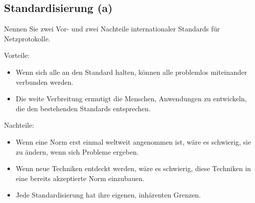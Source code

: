 \setcounter{section}{1}
\setcounter{subsection}{5} %
\subsection{Standardisierung (a)}

Nennen Sie zwei Vor- und zwei Nachteile internationaler Standards für
Netzprotokolle.

Vorteile:
\begin{itemize}
    \item Wenn sich alle an den Standard halten, können alle problemlos
        miteinander verbunden werden.
    \item Die weite Verbreitung ermutigt die Menschen, Anwendungen zu
        entwickeln, die den bestehenden Standards entsprechen.
\end{itemize}

Nachteile:
\begin{itemize}
    \item Wenn eine Norm erst einmal weltweit angenommen ist, wäre es
        schwierig, sie zu ändern, wenn sich Probleme ergeben.
    \item Wenn neue Techniken entdeckt werden, wäre es schwierig, diese
        Techniken in eine bereits akzeptierte Norm einzubauen.
    \item Jede Standardisierung hat ihre eigenen, inhärenten Grenzen.
\end{itemize}
